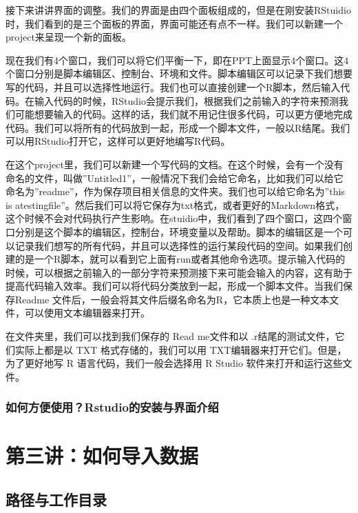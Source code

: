 \documentclass[
  oneside]{book}
\begin{document}
接下来讲讲界面的调整。我们的界面是由四个面板组成的，但是在刚安装RStuidio时，我们看到的是三个面板的界面，界面可能还有点不一样。我们可以新建一个project来呈现一个新的面板。

现在我们有4个窗口，我们可以将它们平衡一下，即在PPT上面显示4个窗口。这4个窗口分别是脚本编辑区、控制台、环境和文件。脚本编辑区可以记录下我们想要写的代码，并且可以选择性地运行。我们也可以直接创建一个R脚本，然后输入代码。在输入代码的时候，RStudio会提示我们，根据我们之前输入的字符来预测我们可能想要输入的代码。这样的话，我们就不用记住很多代码，可以更方便地完成代码。我们可以将所有的代码放到一起，形成一个脚本文件，一般以R结尾。我们可以用RStudio打开它，这样可以更好地编写R代码。

在这个project里，我们可以新建一个写代码的文档。在这个时候，会有一个没有命名的文件，叫做''Untitled1''，一般情况下我们会给它命名，比如我们可以给它命名为''readme''，作为保存项目相关信息的文件夹。我们也可以给它命名为''this is atestingfile''。然后我们可以将它保存为txt格式，或者更好的Markdown格式，这个时候不会对代码执行产生影响。在stuidio中，我们看到了四个窗口，这四个窗口分别是这个脚本的编辑区，控制台，环境变量以及帮助。脚本的编辑区是一个可以记录我们想写的所有代码，并且可以选择性的运行某段代码的空间。如果我们创建的是一个R脚本，就可以看到它上面有run或者其他命令选项。提示输入代码的时候，可以根据之前输入的一部分字符来预测接下来可能会输入的内容，这有助于提高代码输入效率。我们可以将代码分类放到一起，形成一个脚本文件。当我们保存Readme 文件后，一般会将其文件后缀名命名为R，它本质上也是一种文本文件，可以使用文本编辑器来打开。

在文件夹里，我们可以找到我们保存的 Read me文件和以 .r结尾的测试文件，它们实际上都是以 TXT 格式存储的，我们可以用 TXT编辑器来打开它们。但是，为了更好地写 R 语言代码，我们一般会选择用 R Studio 软件来打开和运行这些文件。

\hypertarget{2-Rstudio}{%
\subsection{如何方便使用？Rstudio的安装与界面介绍}\label{2-Rstudio}}

\hypertarget{lesson-3}{%
\chapter{第三讲：如何导入数据}\label{lesson-3}}

\hypertarget{3-path-working-dir}{%
\section{路径与工作目录}\label{3-path-working-dir}}
\end{document}
